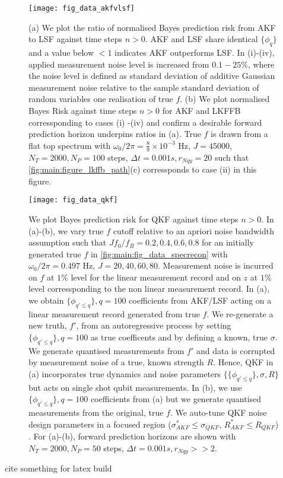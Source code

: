 \begin{figure}
    \texttt{[image: fig\_data\_akfvlsf]}
    \caption{\label{fig:main:fig_data_akfvlsf} (a) We plot the ratio of normalised Bayes prediction risk from AKF to LSF against time steps $n>0$.  AKF and LSF share identical $\{ \phi_q \}$ and  a value below $<1$ indicates AKF outperforms LSF. In (i)-(iv), applied measurement noise level is increased from $0.1 - 25 \%$, where the noise level is defined as standard deviation of additive Gaussian measurement noise relative to the sample standard deviation of random variables one realisation of true $f$. (b) We plot normalised Bayes Risk against time steps $n>0$ for AKF and LKFFB corressponding to cases (i) -(iv) and confirm a desirable forward prediction horizon underpins ratios in (a). True $f$ is drawn from a flat top spectrum with $\omega_0 / 2\pi = \frac{8}{9} \times 10^{-3}$ Hz, $J = 45000$, $N_T = 2000, N_P = 100$ steps, $\Delta t = 0.001s, r_{Nqy}=20$ such that \cref{fig:main:figure_lkffb_path}(c) corressponds to case (ii) in this figure. }
\end{figure}

\begin{figure}[h!]
    \texttt{[image: fig\_data\_qkf]}
    \caption{\label{fig:main:fig_data_qkf2} We plot Bayes prediction risk for QKF against time steps $n>0$. In (a)-(b), we vary true $f$ cutoff relative to an apriori noise bandwidth assumption such that $J f_0 / f_B = 0.2, 0.4, 0.6, 0.8$ for an initially generated true $f$ in \cref{fig:main:fig_data_specrecon} with $\omega_0/ 2\pi = 0.497 $ Hz, $J = 20, 40, 60, 80$. Measurement noise is incurred on $f$ at $1 \%$ level for the linear measurement record and on $z$ at $1\%$ level corressponding to the non linear measurement record. In (a), we obtain $\{\phi_{q' \leq q}\}, q=100$ coefficients from AKF/LSF acting on a linear measurement record generated from true $f$. We re-generate a new truth, $f'$, from an autoregressive process by setting $\{\phi_{q'\leq q}\}, q=100$ as true coefficents and by defining a known, true $\sigma$. We generate quantised measurements from $f'$ and data is corrupted by measurement noise of a true, known strength $R$. Hence, QKF in (a) incorporates true dynamics and noise parameters $\{\{\phi_{q' \leq q} \}, \sigma, R\}$ but acts on single shot qubit measurements. In (b), we use $\{\phi_{q' \leq q} \}, q=100$ coefficients from (a) but we generate quantised measurements from the original, true $f$. We auto-tune QKF noise design parameters in a focused region ($\sigma_{AKF}^* \leq \sigma_{QKF}$, $R_{AKF}^* \leq R_{QKF}$) . For (a)-(b), forward prediction horizons are shown with $N_T = 2000, N_P = 50$ steps, $\Delta t = 0.001s, r_{Nqy}>> 2$.}
\end{figure}

\clearpage \newpage 



\clearpage \newpage
cite something for latex build \cite{mavadia2017} 